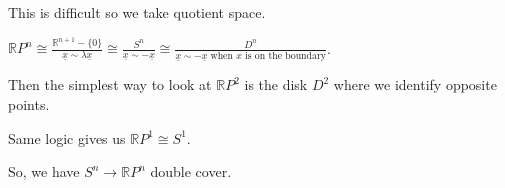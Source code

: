 \documentclass{article}
\theoremstyle{definition}
\begin{document}
    This is difficult so we take quotient space.

    \(\mathbb{R}P^n \cong \frac{\mathbb{R}^{n+1} - \{ 0 \}}{\underline{x} \sim \lambda \underline{x}} \cong \frac{S^n}{\underline{x} \sim -\underline{x}} \cong \frac{D^n}{\underline{x} \sim - \underline{x} \text{ when } x \text{ is on the boundary}}\).

    Then the simplest way to look at \(\mathbb{R}P^2\) is the disk \(D^2\) where we identify opposite points.

    Same logic gives us \(\mathbb{R} P^1 \cong S^1\).

    So, we have \(S^n \to \mathbb{R} P^n\) double cover.

    
\end{document}
